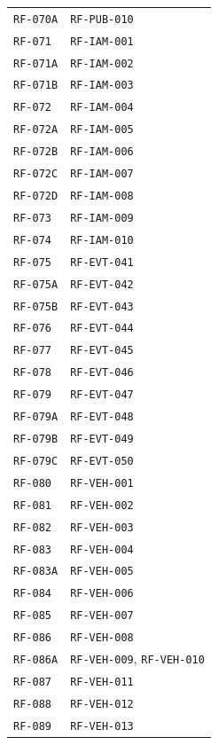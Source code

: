 \documentclass[10pt,letterpaper]{article}
\begin{document}
\begin{longtable}{P{3.0cm}P{10.6cm}}
\texttt{RF-070A} & \texttt{RF-PUB-010}\\
\texttt{RF-071} & \texttt{RF-IAM-001}\\
\texttt{RF-071A} & \texttt{RF-IAM-002}\\
\texttt{RF-071B} & \texttt{RF-IAM-003}\\
\texttt{RF-072} & \texttt{RF-IAM-004}\\
\texttt{RF-072A} & \texttt{RF-IAM-005}\\
\texttt{RF-072B} & \texttt{RF-IAM-006}\\
\texttt{RF-072C} & \texttt{RF-IAM-007}\\
\texttt{RF-072D} & \texttt{RF-IAM-008}\\
\texttt{RF-073} & \texttt{RF-IAM-009}\\
\texttt{RF-074} & \texttt{RF-IAM-010}\\
\texttt{RF-075} & \texttt{RF-EVT-041}\\
\texttt{RF-075A} & \texttt{RF-EVT-042}\\
\texttt{RF-075B} & \texttt{RF-EVT-043}\\
\texttt{RF-076} & \texttt{RF-EVT-044}\\
\texttt{RF-077} & \texttt{RF-EVT-045}\\
\texttt{RF-078} & \texttt{RF-EVT-046}\\
\texttt{RF-079} & \texttt{RF-EVT-047}\\
\texttt{RF-079A} & \texttt{RF-EVT-048}\\
\texttt{RF-079B} & \texttt{RF-EVT-049}\\
\texttt{RF-079C} & \texttt{RF-EVT-050}\\
\texttt{RF-080} & \texttt{RF-VEH-001}\\
\texttt{RF-081} & \texttt{RF-VEH-002}\\
\texttt{RF-082} & \texttt{RF-VEH-003}\\
\texttt{RF-083} & \texttt{RF-VEH-004}\\
\texttt{RF-083A} & \texttt{RF-VEH-005}\\
\texttt{RF-084} & \texttt{RF-VEH-006}\\
\texttt{RF-085} & \texttt{RF-VEH-007}\\
\texttt{RF-086} & \texttt{RF-VEH-008}\\
\texttt{RF-086A} & \texttt{RF-VEH-009}, \texttt{RF-VEH-010}\\
\texttt{RF-087} & \texttt{RF-VEH-011}\\
\texttt{RF-088} & \texttt{RF-VEH-012}\\
\texttt{RF-089} & \texttt{RF-VEH-013}\\

\end{longtable}
\end{document}
